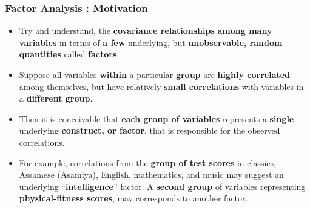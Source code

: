 \documentclass[10pt]{beamer} %
\begin{document}
\begin{frame}
   \frametitle{Factor Analysis : Motivation}
   \begin{itemize}
      \item Try and understand, the \textbf{covariance relationships}
         \textbf{among many variables} in terms of \textbf{a few} underlying,
         but \textbf{unobservable, random quantities} called \textbf{factors}. 
         \vspace{0.5cm}
      \item Suppose all variables \textbf{within} a particular \textbf{group}
         are \textbf{highly correlated} among themselves, but have relatively
         \textbf{small correlations} with variables in a \textbf{different
         group}.
         \vspace{0.5cm}
      \item Then it is conceivable that \textbf{each group of variables}
         represents a \textbf{single} underlying \textbf{construct, or factor},
         that is responsible for the observed correlations.
         \vspace{0.5cm}
      \item For example, correlations from the \textbf{group of test scores} in
         classics, Assamese (Asamiya), English, mathematics, and music  may
         suggest an underlying ``\textbf{intelligence}'' factor. A
         \textbf{second group} of variables representing
         \textbf{physical-fitness scores}, may corresponds to another factor. 
   \end{itemize}
\end{frame}
\end{document}

